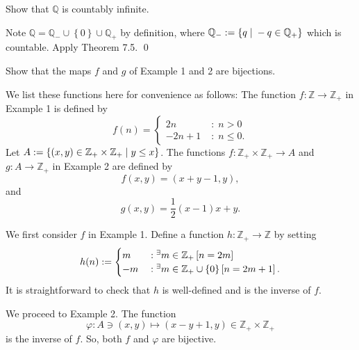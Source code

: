 \documentclass[a4paper,12pt]{article}
\begin{document}
\begin{exe}
	Show that \( \mathbb{Q} \) is countably infinite.
\end{exe}\begin{sol}
	Note
	\( \mathbb{Q}=\mathbb{Q}_{-} \cup \left\{ 0 \right\} \cup \mathbb{Q}_{+} \)
	by definition,
	where
	\( \mathbb{Q}_{-}:=\left\{ q \;|\; -q \in \mathbb{Q}_{+} \right\} \)
	which is countable.
	Apply Theorem 7.5.
	\qed\end{sol}

\begin{exe}
	Show that the maps \( f \) and \( g \) of Example 1 and 2 are bijections.
\end{exe}\begin{sol}
	We list these functions here for convenience as follows:
	The function \( f:\mathbb{Z} \to \mathbb{Z}_{+} \) in Example 1 is defined by
	\begin{equation*}
		f(n) = \begin{cases}
			2n    & \;\mathrm{:}\;n>0    \\
			-2n+1 & \;\mathrm{:}\;n\le0.
		\end{cases}
	\end{equation*}
	Let
	\( A:=\left\{ (x,y)\in \mathbb{Z}_{+} \times \mathbb{Z}_{+}
	\;|\; y \le x\right\} \).
	The functions
	\( f:\mathbb{Z}_{+} \times \mathbb{Z}_{+} \to A\)
	and
	\( g:A \to \mathbb{Z}_{+} \)
	in Example 2 are defined by
	\begin{equation*}
		f(x,y) = (x+y-1,y),
	\end{equation*}
	and
	\begin{equation*}
		g(x,y)=\frac{1}{2}(x-1)x+y.
	\end{equation*}
	
	We first consider \( f \) in Example 1.
	Define a function \( h:\mathbb{Z}_{+} \to \mathbb{Z} \) by setting
	\begin{equation*}
		h(n):=\begin{cases}
			m  & \;\mathrm{:}\;
			{}^{\exists} m \in \mathbb{Z}_{+}\left[ n=2m \right] \\
			-m & \;\mathrm{:}\;
			{}^{\exists} m \in \mathbb{Z}_{+} \cup \left\{ 0 \right\}
			\left[ n=2m + 1 \right].
		\end{cases}
	\end{equation*}
	It is straightforward to check that \( h \) is well-defined and is the inverse of \( f \).
	
	We proceed to Example 2.
	The function
	\begin{equation*}
		\varphi:A \ni (x,y) \mapsto (x-y+1,y) \in \mathbb{Z}_{+} \times \mathbb{Z}_{+}
	\end{equation*}
	is the inverse of \( f \).
	So, both \( f \) and \( \varphi \) are bijective.
	

\end{sol}
\end{document}

